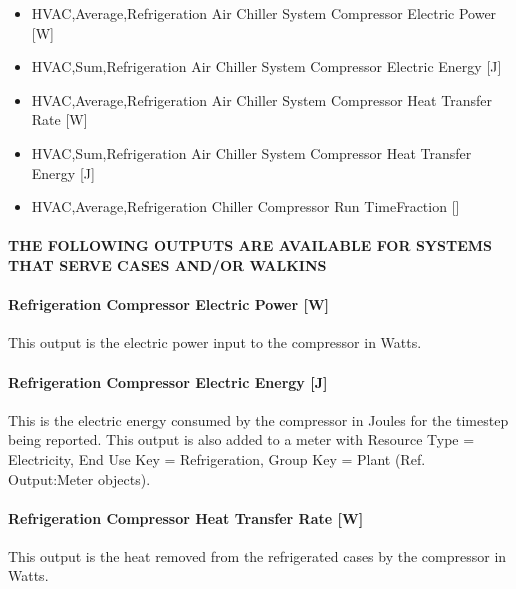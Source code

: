 \begin{itemize}
\item
  HVAC,Average,Refrigeration Air Chiller System Compressor Electric Power {[}W{]}
\item
  HVAC,Sum,Refrigeration Air Chiller System Compressor Electric Energy {[}J{]}
\item
  HVAC,Average,Refrigeration Air Chiller System Compressor Heat Transfer Rate {[}W{]}
\item
  HVAC,Sum,Refrigeration Air Chiller System Compressor Heat Transfer Energy {[}J{]}
\item
  HVAC,Average,Refrigeration Chiller Compressor Run TimeFraction {[]}
\end{itemize}

\paragraph{THE FOLLOWING OUTPUTS ARE AVAILABLE FOR SYSTEMS THAT SERVE CASES AND/OR WALKINS}\label{the-following-outputs-are-available-for-systems-that-serve-cases-andor-walkins-1}

\paragraph{Refrigeration Compressor Electric Power {[}W{]}}\label{refrigeration-compressor-electric-power-w}

This output is the electric power input to the compressor in Watts.

\paragraph{Refrigeration Compressor Electric Energy {[}J{]}}\label{refrigeration-compressor-electric-energy-j}

This is the electric energy consumed by the compressor in Joules for the timestep being reported. This output is also added to a meter with Resource Type = Electricity, End Use Key = Refrigeration, Group Key = Plant (Ref. Output:Meter objects).

\paragraph{Refrigeration Compressor Heat Transfer Rate {[}W{]}}\label{refrigeration-compressor-heat-transfer-rate-w}

This output is the heat removed from the refrigerated cases by the compressor in Watts.

